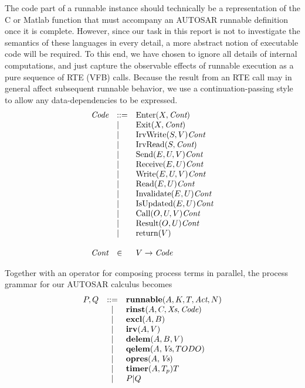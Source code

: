 \documentclass[twocolumn]{article}
\begin{document}
The code part of a runnable instance should technically be a representation of the C or Matlab function that must accompany an AUTOSAR runnable definition once it is complete. However, since our task in this report is not to investigate the semantics of these languages in every detail, a more abstract notion of executable code will be required. To this end, we have chosen to ignore all details of internal computations, and just capture the observable effects of runnable execution as a pure sequence of RTE (VFB) calls. Because the result from an RTE call may in general affect subsequent runnable behavior, we use a continuation-passing style to allow any data-dependencies to be expressed.
$$
\begin{array}{lll}
	\text{\it Code}	& ::=	& \text{Enter}(X,\text{\it Cont})			\\
			& |	& \text{Exit}(X,\text{\it Cont})			\\
			& |	& \text{IrvWrite}(S,V){\text{\it Cont}}		\\
			& |	& \text{IrvRead}(S,\text{\it Cont})			\\
			& |	& \text{Send}(E,U,V){\text{\it Cont}}		\\
			& |	& \text{Receive}(E,U){\text{\it Cont}}		\\
			& |	& \text{Write}(E,U,V){\text{\it Cont}}		\\
			& |	& \text{Read}(E,U){\text{\it Cont}}		\\
			& |	& \text{Invalidate}(E,U){\text{\it Cont}}		\\
			& |	& \text{IsUpdated}(E,U){\text{\it Cont}}		\\
			& |	& \text{Call}(O,U,V){\text{\it Cont}}		\\
			& |	& \text{Result}(O,U){\text{\it Cont}}		\\
			& |	& \text{return}(V)				\\
	\\
	\text{\it Cont}	& \in	& V \rightarrow \text{\it Code}		\\
\end{array}
$$

Together with an operator for composing process terms in parallel, the process grammar for our AUTOSAR calculus becomes
$$
\begin{array}{rcll}
	P,Q 	& ::= &
		\textbf{runnable}(A,K,T,\text{\it Act},N)	\\
		& | &
		\textbf{rinst}(A,C,\text{\it Xs},\text{\it Code})	\\
		& | &
		\textbf{excl}(A,B)			\\
		& | &
		\textbf{irv}(A,V)				\\
		& | &
		\textbf{delem}(A,B,V)			\\
		& | &
		\textbf{qelem}(A,\text{\it Vs},TODO)			\\
		& | &
		\textbf{opres}(A,\text{\it Vs})			\\
		& | &
		\textbf{timer}(A,T_p){T}		\\
		& | &
		P|Q					\\
\end{array}
$$
\end{document}

